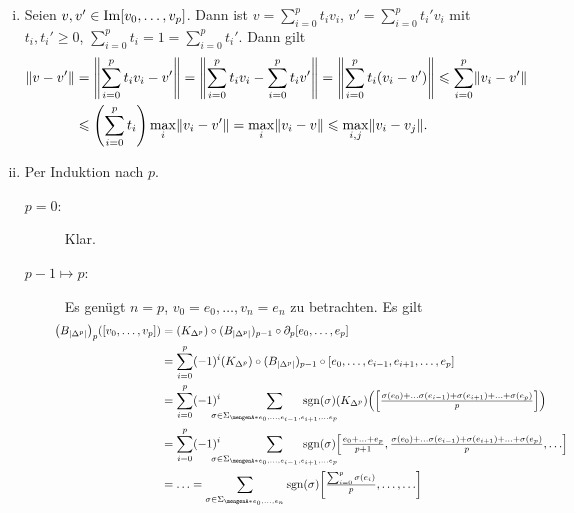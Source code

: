 \begin{enumerate}[(i)]
	\item Seien $v,v' \in \operatorname{Im} [v_0, \ldots ,v_p]$. Dann ist $v = \sum_{i=0}^{p} t_i v_i$, $v' = \sum_{i=0}^{p} t_i' v_i$ mit $t_i, t_i' \ge 0$, 
	$\sum_{i=0}^{p} t_i =1 = \sum_{i=0}^{p} t_i'$. Dann gilt
	\begin{align*}
		\norm{v-v'} &= \norm{\sum_{i=0}^{p} t_i v_i - v'} = \norm{\sum_{i=0}^{p} t_i v_i - \sum_{i=0}^{p} t_i v'} = \norm{\sum_{i=0}^{p} t_i(v_i -v')}
		\le \sum_{i=0}^{p} \norm{v_i -v'}   \\
		&\le \enbrace*{\sum_{i=0}^{p} t_i} \max_i \norm{v_i -v'} = \max_i \norm{v_i -v} \le \max_{i,j} \norm{v_i - v_j}.   
	\end{align*}
	\item Per Induktion nach $p$.
	\begin{description}
		\item[$p=0$:] Klar.
		\item[$p-1 \mapsto p$:] Es genügt $n=p$, $v_0=e_0, \ldots , v_n=e_n$ zu betrachten. Es gilt
		\begin{align*}
			\hspace{-1em}\enbrace*{B_{\abs*{\Delta^p}}}_p \enbrace*{[v_0,\ldots ,v_p]} &= (K_{\Delta^p}) \circ (B_{\abs*{\Delta^p}})_{p-1} \circ \partial_p [e_0, \ldots ,e_p] \\
			&= \sum_{i=0}^{p} (-1)^i (K_{\Delta^p}) \circ (B_{\abs*{\Delta^p}})_{p-1} \circ [e_0, \ldots , e_{i-1}, e_{i+1}, \ldots ,e_p] \\
			&= \sum_{i=0}^{p} (-1)^i \hspace{-1em} \sum_{\sigma \in \Sigma_{\set{e_0, \ldots ,e_{i-1}, e_{i+1}, \ldots e_p} }}  \hspace{-3.2em}\sgn(\sigma) (K_{\Delta^p}) \enbrace*{
			\textstyle\benbrace*{\frac{\sigma(e_0) + \ldots \sigma(e_{i-1}) + \sigma(e_{i+1}) + \ldots  + \sigma(e_p)}{p} } } \\
			&= \sum_{i=0}^{p} (-1)^i \hspace{-1em}\sum_{\sigma \in \Sigma_{\set{e_0, \ldots ,e_{i-1}, e_{i+1}, \ldots e_p} }} \hspace{-3.2em} \sgn(\sigma)
			\benbrace*{\textstyle\frac{e_0 + \ldots + e_p}{p+1}, \frac{\sigma(e_0) + \ldots \sigma(e_{i-1}) + \sigma(e_{i+1}) + \ldots  + \sigma(e_p)}{p}, \ldots} \\
			&=\ldots = \sum_{\sigma \in \Sigma_{\set{e_0, \ldots ,e_n}}} \sgn(\sigma) \benbrace*{\textstyle \frac{\sum_{i=0}^{p} \sigma(e_i)}{p}, \ldots , \ldots} 
		\end{align*}  

\end{description}
\end{enumerate}
